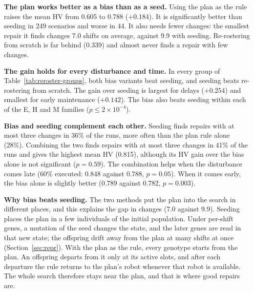 \textbf{The plan works better as a bias than as a seed.}
Using the plan as the rule raises the mean HV from 0.605 to 0.788 ($+0.184$).
It is significantly better than seeding in 249 scenarios and worse in 44.
It also needs fewer changes: the smallest repair it finds changes 7.0 shifts on average, against 9.9 with seeding.
Re-rostering from scratch is far behind (0.339) and almost never finds a repair with few changes.

\textbf{The gain holds for every disturbance and time.}
In every group of Table~\ref{tab:reroster-groups}, both bias variants beat seeding, and seeding beats re-rostering from scratch.
The gain over seeding is largest for delays ($+0.254$) and smallest for early maintenance ($+0.142$).
The bias also beats seeding within each of the E, H and M families ($p \le 2 \times 10^{-4}$).

\textbf{Bias and seeding complement each other.}
Seeding finds repairs with at most three changes in 36\% of the runs, more often than the plan rule alone (28\%).
Combining the two finds repairs with at most three changes in 41\% of the runs and gives the highest mean HV (0.815),
although its HV gain over the bias alone is not significant ($p = 0.59$).
The combination helps when the disturbance comes late (60\% executed: 0.848 against 0.788, $p = 0.05$).
When it comes early, the bias alone is slightly better (0.789 against 0.782, $p = 0.003$).

\textbf{Why bias beats seeding.}
The two methods put the plan into the search in different places, and this explains the gap in changes (7.0 against 9.9).
Seeding places the plan in a few individuals of the initial population.
Under per-shift genes, a mutation of the seed changes the state, and the later genes are read in that new state;
the offspring drift away from the plan at many shifts at once (Section~\ref{sec:repr}).
With the plan as the rule, every genotype starts from the plan.
An offspring departs from it only at its active slots, and after each departure the rule returns to the plan's robot whenever that robot is available.
The whole search therefore stays near the plan, and that is where good repairs are.
